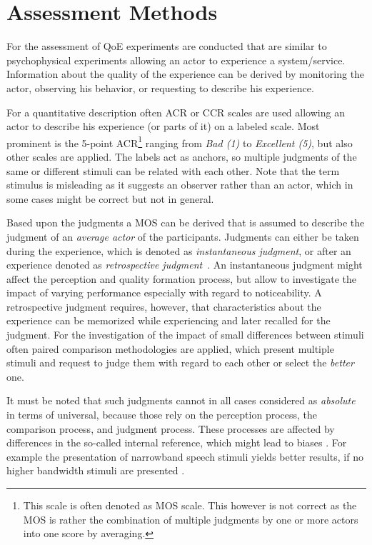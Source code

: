 \section{Assessment Methods}
For the assessment of \ac{QoE} experiments are conducted that are similar to psychophysical experiments allowing an actor to experience a system/service.
Information about the quality of the experience can be derived by monitoring the actor, observing his behavior, or requesting to describe his experience.

For a quantitative description often \ac{ACR} or \ac{CCR} scales are used allowing an actor to describe his experience (or parts of it) on a labeled scale.
Most prominent is the 5-point \ac{ACR}\footnote{This scale is often denoted as  \ac{MOS} scale. This however is not correct as the \ac{MOS} is rather the combination of multiple judgments by one or more actors into one score by averaging.} ranging from \emph{Bad (1)} to \emph{Excellent (5)}, but also other scales are applied.
The labels act as anchors, so multiple judgments of the same or different stimuli can be related with each other.
Note that the term stimulus is misleading as it suggests an observer rather than an actor, which in some cases might be correct but not in general.

Based upon the judgments a \ac{MOS} can be derived that is assumed to describe the judgment of an \emph{average actor} of the participants.
Judgments can either be taken during the experience, which is denoted as \emph{instantaneous judgment}, or after an experience denoted as \emph{retrospective judgment}~\cite{weiss_temporal_2014}.
An instantaneous judgment might affect the perception and quality formation process, but allow to investigate the impact of varying performance especially with regard to noticeability.
A retrospective judgment requires, however, that characteristics about the experience can be memorized while experiencing and later recalled for the judgment.
For the investigation of the impact of small differences between stimuli often paired comparison methodologies are applied, which present multiple stimuli and request to judge them with regard to each other or select the \emph{better} one.

It must be noted that such judgments cannot in all cases considered as \emph{absolute} in terms of universal, because those rely on the perception process, the comparison process, and judgment process.
These processes are affected by differences in the so-called internal reference, which might lead to biases \citep[\cf,][]{zielinski_biases_2008, pitrey_aligning_2011}.
For example the presentation of narrowband speech stimuli yields better results, if no higher bandwidth stimuli are presented \citep[\cf,][]{koster_comparison_2015}.


